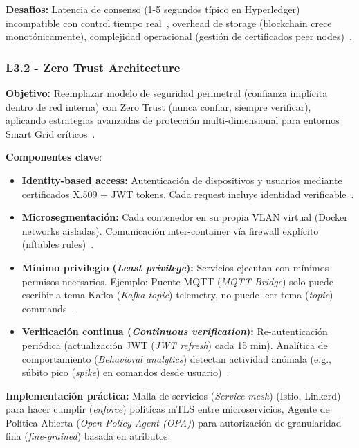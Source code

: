 \textbf{Desafíos:} Latencia de consenso (1-5 segundos típico en Hyperledger) incompatible con control tiempo real~\cite{wulurCoordinationEdgeCloud2024}, overhead de storage (blockchain crece monotónicamente), complejidad operacional (gestión de certificados peer nodes)~\cite{ramakrishnaAnalysisLightweightCryptographic2024}.

\subsubsection{L3.2 - Zero Trust Architecture}

\textbf{Objetivo:} Reemplazar modelo de seguridad perimetral (confianza implícita dentro de red interna) con Zero Trust (nunca confiar, siempre verificar), aplicando estrategias avanzadas de protección multi-dimensional para entornos Smart Grid críticos~\cite{augmentingSecuritySmart2024,sairamIntegratedLightweightCryptographic2024,syamsSecureCommunicationIntegrating2024}.

\textbf{Componentes clave}:
\begin{itemize}
\item \textbf{Identity-based access:} Autenticación de dispositivos y usuarios mediante certificados X.509 + JWT tokens. Cada request incluye identidad verificable~\cite{eldefrawyFormallyVerifiedAuthentication2019,liangSecurityLightweightAuthentication2018}.
\item \textbf{Microsegmentación:} Cada contenedor en su propia VLAN virtual (Docker networks aisladas). Comunicación inter-container vía firewall explícito (nftables rules)~\cite{alrobaiSecurePartitioningEmbedded2024}.
\item \textbf{Mínimo privilegio (\textit{Least privilege}):} Servicios ejecutan con mínimos permisos necesarios. Ejemplo: Puente MQTT (\textit{MQTT Bridge}) solo puede escribir a tema Kafka (\textit{Kafka topic}) telemetry, no puede leer tema (\textit{topic}) commands~\cite{kandahNavigatingIoTSecurity2025}.
\item \textbf{Verificación continua (\textit{Continuous verification}):} Re-autenticación periódica (actualización JWT (\textit{JWT refresh}) cada 15 min). Analítica de comportamiento (\textit{Behavioral analytics}) detectan actividad anómala (e.g., súbito pico (\textit{spike}) en comandos desde usuario)~\cite{nandalSECURITYRISKSIoT2025,matiasEnhancingEffectivenessSecurity2024}.
\end{itemize}

\textbf{Implementación práctica:} Malla de servicios (\textit{Service mesh}) (Istio, Linkerd) para hacer cumplir (\textit{enforce}) políticas mTLS entre microservicios, Agente de Política Abierta (\textit{Open Policy Agent (OPA)}) para autorización de granularidad fina (\textit{fine-grained}) basada en atributos.

